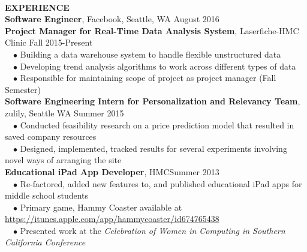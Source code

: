 \documentclass[11.5pt]{article}
\newcommand{\wrapTitle}[1]{{\sectionNL \textbf{\Large #1}} \sectionNL}
\newcommand{\sectionNL}{~\\[1pt]}
\newcommand{\customtab}{$\hspace{10pt} \bullet \hspace{2pt}$}
\newcommand{\HMC}{HMC}
\newcommand{\rightAlign}{\hfill}
\begin{document}
\begin{flushleft}
\wrapTitle{EXPERIENCE}
\textbf{Software Engineer}, Facebook, Seattle, WA \rightAlign August 2016 \\
\textbf{Project Manager for Real-Time Data Analysis System}, Laserfiche-HMC Clinic \rightAlign Fall 2015-Present \\ 
\customtab Building a data warehouse system to handle flexible unstructured data \\
\customtab Developing trend analysis algorithms to work across different types of data \\
\customtab Responsible for maintaining scope of project as project manager (Fall Semester)\\
\textbf{Software Engineering Intern for Personalization and Relevancy Team}, zulily, Seattle WA \rightAlign Summer 2015 \\
\customtab Conducted feasibility research on a price prediction model that resulted in saved company resources \\
\customtab Designed, implemented, tracked results for several experiments involving novel ways of arranging the site \\

\textbf{Educational iPad App Developer}, \HMC \rightAlign Summer 2013 \\
\customtab Re-factored, added new features to, and published educational iPad apps for middle school students \\
\customtab Primary game, Hammy Coaster available at \url{https://itunes.apple.com/app/hammycoaster/id674765438} \\
\customtab Presented work at the \textit{Celebration of Women in Computing in Southern California Conference }
\end{flushleft}


\end{document}
